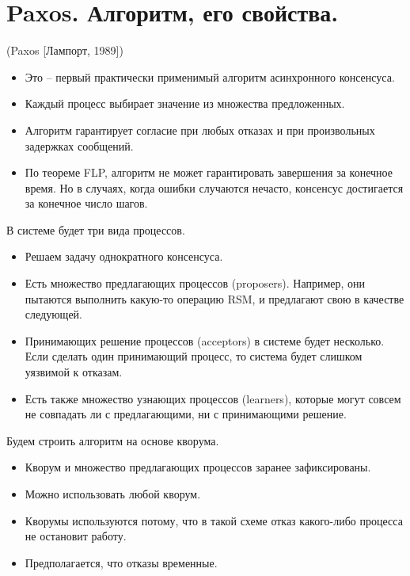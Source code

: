 \section{Paxos. Алгоритм, его свойства.}

\begin{algorithm}(Paxos [Лампорт, 1989])

    \begin{itemize}
        \item Это -- первый практически применимый алгоритм асинхронного
            консенсуса.
        \item Каждый процесс выбирает значение из множества предложенных.
        \item Алгоритм гарантирует согласие при любых отказах и при произвольных
            задержках сообщений.
        \item По теореме FLP, алгоритм не может гарантировать завершения за
            конечное время. Но в случаях, когда ошибки случаются нечасто,
            консенсус достигается за конечное число шагов.
    \end{itemize}
    В системе будет три вида процессов.
    \begin{itemize}
        \item Решаем задачу однократного консенсуса.
        \item Есть множество предлагающих процессов (proposers). Например, они
            пытаются выполнить какую-то операцию RSM, и предлагают
            свою в качестве следующей.
        \item Принимающих решение процессов (acceptors) в системе будет несколько. Если
            сделать один принимающий процесс, то система будет слишком
            уязвимой к отказам.
        \item Есть также множество узнающих процессов (learners), которые могут
            совсем не совпадать ли с предлагающими, ни с принимающими решение.
    \end{itemize}
    Будем строить алгоритм на основе кворума.
    \begin{itemize}
        \item Кворум и множество предлагающих процессов заранее зафиксированы.
        \item Можно использовать любой кворум.
        \item Кворумы используются потому, что в такой схеме отказ какого-либо
            процесса не остановит работу.
        \item Предполагается, что отказы временные.

\end{itemize}
\end{algorithm}
